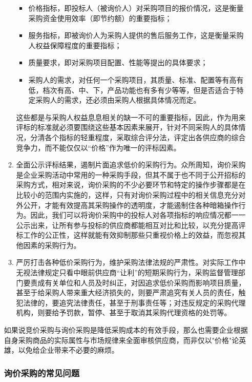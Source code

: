 \begin{enumerate}
\begin{enumerate}
        \begin{itemize}
            \item  价格指标，即投标人（被询价人）对采购项目的报价情况，这是衡量采购资金使用效率（即节约额）的重要指标；
            \item  服务指标，即被询价人为采购人提供的售后服务工作，这是衡量采购人权益保障程度的重要指标；
            \item  质量要求，即对采购项目配置、性能等提出的具体要求；
            \item  采购人的需求，对任何一个采购项目，其质量、标准、配置等有高有低，档次有高、中、下，产品功能也有多有少等等，但是否适合于特定采购人的需求，还必须由采购人根据具体情况而定。
        \end{itemize}

        这些都是与采购人权益息息相关的缺一不可的重要指标，因此，作为用来评标的标准就必须要围绕这些基本因素来展开，针对不同采购人的具体情况，分清各个指标的轻重程度，采取综合评分法，评定出各供应商的综合竞争力，而不能仅仅以“价格”作为唯一的评标因素。

        \item  全面公示评标结果，遏制片面追求低价的采购行为。众所周知，询价采购是企业采购活动中常用的一种采购手段，但其不属于也不同于公开招标的采购方式，相对来说，询价采购的不少必要环节和特定的操作步骤都是在比较小的范围内实施的，这样，只有对询价采购过程中的相关信息充分对外公开，才能有效提高其采购操作的透明度，才能遏制住各种暗箱操作行为。因此，我们可以将询价采购中的投标人对各项指标的响应情况都一一公示出来，让所有参与投标的供应商都能相互对比和比较，以充分提高评标工作的公正性，这样就能有效抑制那些只重视价格上的效益，而忽视其他因素的采购行为。

        \item  严厉打击各种低价采购行为，维护采购法律法规的严肃性。对实际工作中无视法律规定只看中眼前供应商“让利”的短期采购行为，采购监督管理部门要责成有关单位和人员及时纠正，对因追求低价采购而影响项目质量，甚至于给采购人带来重大经济损失的，则要严肃追究有关人员的责任，触犯法律的，要追究法律责任，甚至于刑事责任等；对违反规定的采购代理机构，则要给予罚款，暂停、甚至于取消其采购代理资格的处罚等。

    \end{enumerate}

        如果说竞价采购与询价采购是降低采购成本的有效手段，那么也需要企业根据自身采购商品的实际属性与市场规律来全面审核供应商，而非仅以"价格"论英雄，以免给企业带来不必要的麻烦。

\subsubsection {询价采购的常见问题}


\end{enumerate}
